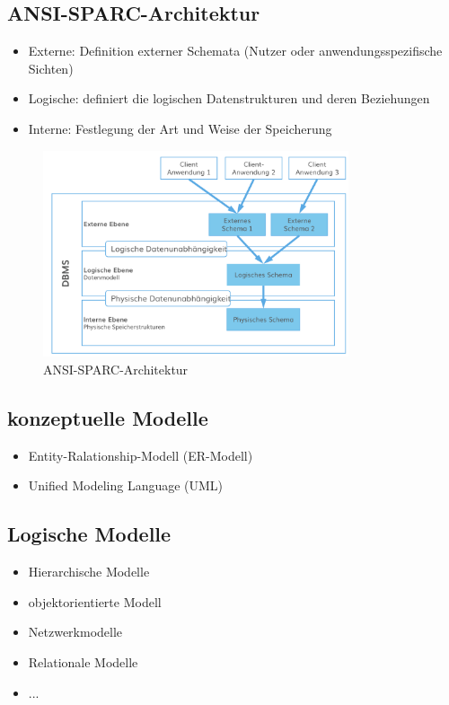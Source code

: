 \documentclass[a4paper]{article}
\begin{document}
\subsection{ANSI-SPARC-Architektur}
\begin{itemize}
    \item Externe: Definition externer Schemata (Nutzer oder anwendungsspezifische Sichten)
    \item Logische: definiert die logischen Datenstrukturen und deren Beziehungen
    \item Interne: Festlegung der Art und Weise der Speicherung
\end{itemize}

\begin{figure}[htp]
    \centering
    \includegraphics[width=9cm]{images/ANSI-SPARC}
    \caption{ANSI-SPARC-Architektur}
    \label{fig:ANSI-SPARC}
\end{figure}

\subsection{konzeptuelle Modelle}
\begin{itemize}
    \item Entity-Ralationship-Modell (ER-Modell)
    \item Unified Modeling Language (UML)
\end{itemize}

\subsection{Logische Modelle}
\begin{itemize}
    \item Hierarchische Modelle
    \item objektorientierte Modell
    \item Netzwerkmodelle
    \item Relationale Modelle
    \item ...
\end{itemize}
\end{document}
